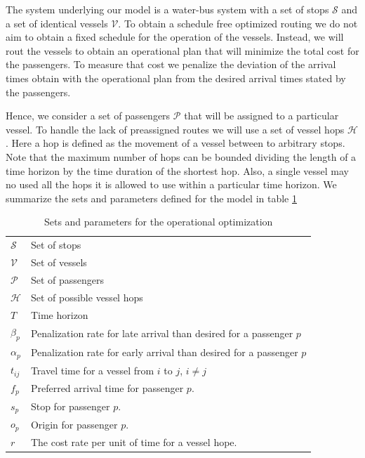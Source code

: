 \documentclass[12pt]{elsarticle}
\begin{document}
The system underlying our model is a water-bus system with a set of stops
$\mathcal{S}$ and a set of identical vessels $\mathcal{V}$. To obtain a
schedule free optimized routing we do not aim to obtain a fixed schedule for
the operation of the vessels. Instead, we will rout the vessels to obtain an
operational plan that will minimize the total cost for the passengers. To
measure that cost we penalize the deviation of the arrival times obtain with
the operational plan from the desired arrival times stated by the passengers.

Hence, we consider a set of passengers $\mathcal{P}$ that will be assigned to
a particular vessel. To handle the lack of preassigned routes we will use a
set of vessel hops $\mathcal{H}$. Here a hop is defined as the movement of a
vessel between to arbitrary stops. Note that the maximum number of hops can
be bounded dividing the length of a time horizon by the time duration of the
shortest hop. Also, a single vessel may no used all the hops it is allowed to
use within a particular time horizon. We summarize the sets and parameters
defined for the model in table \ref{tab:parameters}
\begin{table}
  \centering
  \begin{tabular}{ll}
  \hline
  $\mathcal{S}$ &  Set of stops \\
  $\mathcal{V}$ &  Set of vessels \\
  $\mathcal{P}$ & Set of passengers\\
  $\mathcal{H}$ & Set of possible vessel hops\\
  $T$ & Time horizon \\
  $\beta_{p}$ & Penalization rate for late arrival than desired
                   for a passenger $p$ \\
  $\alpha_{p}$ & Penalization rate for early arrival than desired
                 for a passenger $p$ \\
  $t_{ij}$ & Travel time for a vessel from $i$ to $j$, $i \neq j$ \\
  $f_p$ & Preferred arrival time for passenger $p$.\\
  $s_p$ & Stop for passenger $p$.\\
  $o_p$ & Origin for passenger $p$.\\
  $r$ & The cost rate per unit of time for a vessel hope.\\
  \hline
\end{tabular}
  \caption{Sets and parameters for the operational optimization}\label{tab:parameters}
\end{table}
\end{document}
